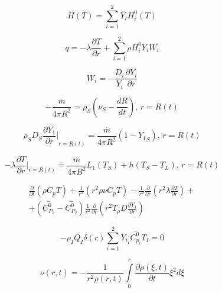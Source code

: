  \begin{equation}
 H\left(T\right)=\sum _{i=1}^{2}Y_{i}{H}_{i}^{0}\left(T\right) 
 \end{equation} 

 \begin{equation}
 q=-\lambda \frac{\partial T}{\partial r}+\sum _{i=1}^{2}\rho {H}_{i}^{0}{Y}_{i}{W}_{i}  \end{equation} 
 
  \begin{equation}
 {W}_{i}=-\frac{{D}_{i}}{{Y}_{i}}\frac{\partial {Y}_{i}}{\partial r} 
 \end{equation} 
 
 \begin{equation} 
  -\frac{\stackrel{.}{m}}{4\pi {R}^{2}}={\rho }_{S}\left({\nu}_{S}-\frac{dR}{dt}\right) , \, r=R\left(t\right)   
\end{equation} 

\begin{equation}
  {\rho }_{S}{D}_{S}{\frac{\partial {Y}_{1}}{\partial r}|}_{r=R\left(t\right)}=\frac{\stackrel{.}{m}}{4\pi {R}^{2}}\left(1-{Y_1}_{S}\right), \, r=R\left(t\right)
 \end{equation} 
 
 \begin{equation}
 -\lambda {\frac{\partial T}{\partial r}}|_{r=R\left(t\right)}=\frac{\stackrel{.}{m}}{4\pi {B}^{2}}{L}_{1}\left({T}_{S}\right)+h\left({T}_{S}-{T}_{L}\right), \, r=R\left(t\right) 
 \end{equation} 

\begin{multline}
 \frac{\partial }{\partial t}\left(\rho {C}_{p}T\right)+\frac{1}{{r}^{2}}\left({r}^{2}\rho \nu{C}_{p}T\right)-\frac{1}{{r}^{2}}\frac{\partial }{\partial r}\left({r}^{2}\lambda \frac{\partial T}{\partial r}\right)+\\
 +\left(\stackrel{-}{{C}_{{P}_{1}}^{0}}-\stackrel{-}{{C}_{{P}_{2}}^{0}}\right)\frac{1}{{r}^{2}}\frac{\partial }{\partial r}\left({r}^{2}{T}_{\rho }D\frac{\partial {Y}_{1}}{\partial r}\right) \end{multline}

\begin{equation}
 -{\rho }_{I}{Q}_{I}\delta \left(r\right)\sum _{i=1}^{2}{Y}_{{i}_{I}}\stackrel{-}{{C}_{{p}_{i}}^{0}}{T}_{I}=0 \end{equation}

\begin{equation}
 \nu\left(r,t\right)=-\frac{1}{{r}^{2}\rho \left(r,t\right)}\underset{0}{\overset{r}{\int }}\frac{\partial \rho \left(\xi ,t\right)}{\partial t}{\xi }^{2}d\xi  
\end{equation}

